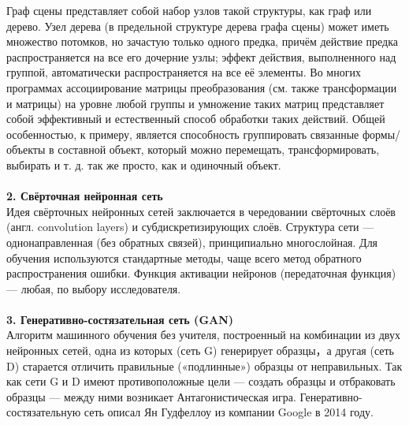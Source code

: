 \documentclass{article}
\begin{document}
    Граф сцены представляет собой набор узлов такой структуры, как граф или дерево. Узел дерева (в предельной структуре дерева графа сцены) может иметь множество потомков, но зачастую только одного предка, причём действие предка распространяется на все его дочерние узлы; эффект действия, выполненного над группой, автоматически распространяется на все её элементы. Во многих программах ассоциирование матрицы преобразования (см. также трансформации и матрицы) на уровне любой группы и умножение таких матриц представляет собой эффективный и естественный способ обработки таких действий. Общей особенностью, к примеру, является способность группировать связанные формы/объекты в составной объект, который можно перемещать, трансформировать, выбирать и т. д. так же просто, как и одиночный объект. \\ \\
    \textbf{2. Свёрточная нейронная сеть}\\
    Идея свёрточных нейронных сетей заключается в чередовании свёрточных слоёв (англ. convolution layers) и субдискретизирующих слоёв. Структура сети — однонаправленная (без обратных связей), принципиально многослойная. Для обучения используются стандартные методы, чаще всего метод обратного распространения ошибки. Функция активации нейронов (передаточная функция) — любая, по выбору исследователя.  \\ \\
    \textbf{3. Генеративно-состязательная сеть (GAN)}\\
    Алгоритм машинного обучения без учителя, построенный на комбинации из двух нейронных сетей, одна из которых (сеть G) генерирует образцы，а другая (сеть D) старается отличить правильные («подлинные») образцы от неправильных. Так как сети G и D имеют противоположные цели — создать образцы и отбраковать образцы — между ними возникает Антагонистическая игра. Генеративно-состязательную сеть описал Ян Гудфеллоу из компании Google в 2014 году.
\end{document}
